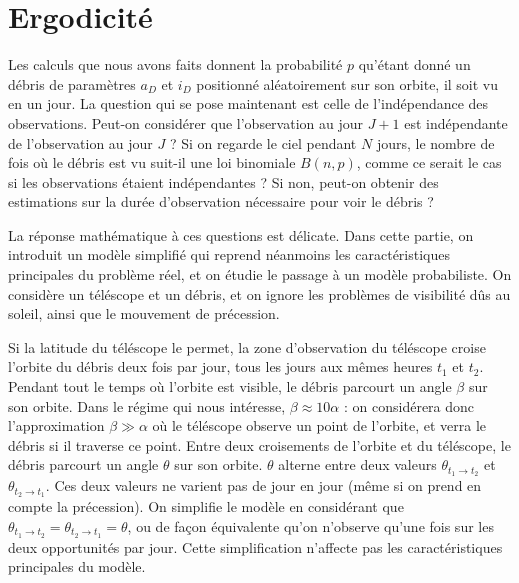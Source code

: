 \documentclass[a4paper,11pt]{article}
\numberwithin{section}{part}
\begin{document}
\section{Ergodicité}
Les calculs que nous avons faits donnent la probabilité $p$ qu'étant
donné un débris de paramètres $a_{D}$ et $i_{D}$ positionné
aléatoirement sur son orbite, il soit vu en un jour. La question qui
se pose maintenant est celle de l'indépendance des
observations. Peut-on considérer que l'observation au jour $J+1$ est
indépendante de l'observation au jour $J$ ? Si on regarde le ciel
pendant $N$ jours, le nombre de fois où le débris est vu suit-il une
loi binomiale $B(n,p)$, comme ce serait le cas si les observations
étaient indépendantes ? Si non, peut-on obtenir des estimations sur la
durée d'observation nécessaire pour voir le débris ?

La réponse mathématique à ces questions est délicate. Dans cette
partie, on introduit un modèle simplifié qui reprend néanmoins les
caractéristiques principales du problème réel, et on étudie le passage
à un modèle probabiliste. On considère un téléscope et un débris, et
on ignore les problèmes de visibilité dûs au soleil, ainsi que le
mouvement de précession.

Si la latitude du téléscope le permet, la zone d'observation du
téléscope croise l'orbite du débris deux fois par jour, tous les jours
aux mêmes heures $t_{1}$ et $t_{2}$. Pendant tout le temps où l'orbite
est visible, le débris parcourt un angle $\beta$ sur son orbite. Dans
le régime qui nous intéresse, $\beta \approx 10 \alpha$ : on
considérera donc l'approximation $\beta \gg \alpha$ où le téléscope
observe un point de l'orbite, et verra le débris si il traverse ce
point. Entre deux croisements de l'orbite et du téléscope, le débris
parcourt un angle $\theta$ sur son orbite. $\theta$ alterne entre deux
valeurs $\theta_{t_{1} \to t_{2}}$ et $\theta_{t_{2} \to t_{1}}$. Ces
deux valeurs ne varient pas de jour en jour (même si on prend en
compte la précession). On simplifie le modèle en considérant que
$\theta_{t_{1} \to t_{2}} = \theta_{t_{2} \to t_{1}} = \theta$, ou de
façon équivalente qu'on n'observe qu'une fois sur les deux
opportunités par jour. Cette simplification n'affecte pas les
caractéristiques principales du modèle.

%   
%   
  
\end{document}
